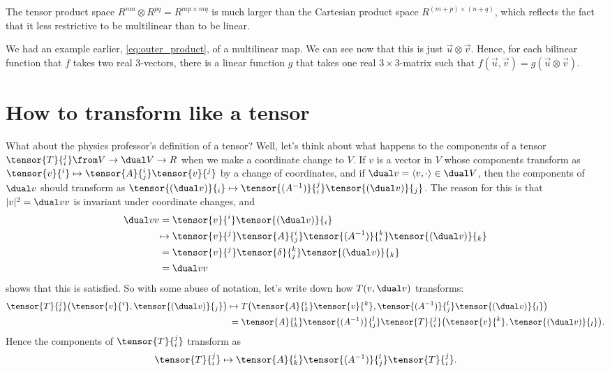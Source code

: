 The tensor product space $R^{mn} \otimes R^{pq} = R^{mp \times mq}$ is much larger than the Cartesian product space $R^{(m + p) \times (n + q)}$, which reflects the fact that it less restrictive to be multilinear than to be linear.

We had an example earlier, \cref{eq:outer_product}, of a multilinear map.
We can see now that this is just $\vec u \otimes \vec v$.
Hence, for each bilinear function that $f$ takes two real $3$-vectors, there is a linear function $g$ that takes one real $3\times3$-matrix such that $f(\vec u, \vec v) = g(\vec u \otimes \vec v)$.


\section{How to transform like a tensor}%
\label{sec:how_to_transform_like_a_tensor}

What about the physics professor's definition of a tensor?
Well, let's think about what happens to the components of a tensor $\tensor{T}{_i^j} \from V \to \dual V \to R$ when we make a coordinate change to $V$.
If $v$ is a vector in $V$ whose components transform as $\tensor{v}{^i} \mapsto \tensor{A}{_j^i} \tensor{v}{^j}$ by a change of coordinates, and if $\dual v = \langle v, \cdot \rangle \in \dual V$, then the components of $\dual v$ should transform as $\tensor{(\dual v)}{_i} \mapsto \tensor{(A^{-1})}{^j_i} \tensor{(\dual v)}{_j}$.
The reason for this is that $|v|^2 = \dual v v$ is invariant under coordinate changes, and
\begin{align*}
	\dual v v ={}& \tensor{v}{^i} \tensor{(\dual v)}{_i}\\
	\mapsto{}& \tensor{v}{^j} \tensor{A}{_j^i} \tensor{(A^{-1})}{^k_i} \tensor{(\dual v)}{_k}\\
	={}& \tensor{v}{^j} \tensor{\delta}{_j^k} \tensor{(\dual v)}{_k}\\
	={}& \dual v v
\end{align*}
shows that this is satisfied.
So with some abuse of notation, let's write down how $T(v, \dual v)$ transforms:
\begin{align*}
	\tensor{T}{_i^j}\big(
		\tensor{v}{^i},
		\tensor{(\dual v)}{_j}
	\big)
	\mapsto{}& T\big(
		\tensor{A}{_k^i} \tensor{v}{^k},
		\tensor{(A^{-1})}{^l_j} \tensor{(\dual v)}{_l}
	\big)\\
	={}& \tensor{A}{_k^i} \tensor{(A^{-1})}{^l_j} \tensor{T}{_i^j}
	\big(
		\tensor{v}{^k},
		\tensor{(\dual v)}{_l}
	\big).
\end{align*}
Hence the components of $\tensor{T}{_i^j}$ transform as
\begin{align}\label{eq:tensor_transformation_rules}
	\tensor{T}{_i^j} \mapsto \tensor{A}{_k^i} \tensor{(A^{-1})}{^l_j} \tensor{T}{_i^j}.
\end{align}

